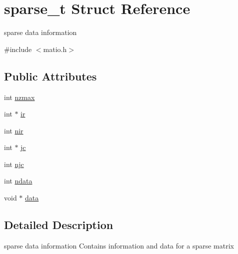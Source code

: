 \hypertarget{structsparse__t}{
\section{sparse\_\-t Struct Reference}
\label{structsparse__t}
}


sparse data information  




{\ttfamily \#include $<$matio.h$>$}

\subsection*{Public Attributes}
\begin{DoxyCompactItemize}
\item 
int \hyperlink{structsparse__t_afd116055ad6a18c27b80333fdac45827}{nzmax}
\item 
int $\ast$ \hyperlink{structsparse__t_ae3b4cd31e90bb824e9b00f7c3dec7af4}{ir}
\item 
int \hyperlink{structsparse__t_a6aa1a08cc2760a36771edd65df8cf111}{nir}
\item 
int $\ast$ \hyperlink{structsparse__t_aeea61c5d15e5cc015a8baf55cc130ee1}{jc}
\item 
int \hyperlink{structsparse__t_aa0ef6a0c8be3ad0e3a222371e68f7dd4}{njc}
\item 
int \hyperlink{structsparse__t_ab692009004070fda2da8274767a0788d}{ndata}
\item 
void $\ast$ \hyperlink{structsparse__t_a8194f9468a7d77514db5ed70b54017bb}{data}
\end{DoxyCompactItemize}


\subsection{Detailed Description}
sparse data information Contains information and data for a sparse matrix 

